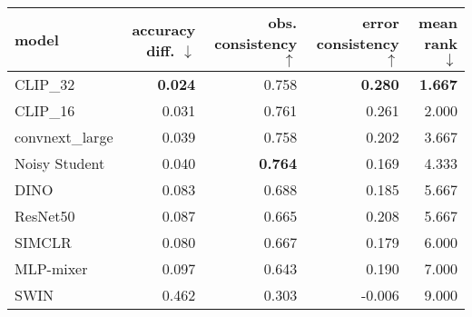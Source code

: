 \begin{tabular}{lrrrr}
\toprule
          model & accuracy diff. $\downarrow$ & obs. consistency $\uparrow$ & error consistency $\uparrow$ & mean rank $\downarrow$ \\
\midrule
       CLIP\_32 &              \textbf{0.024} &                       0.758 &               \textbf{0.280} &         \textbf{1.667} \\
       CLIP\_16 &                       0.031 &                       0.761 &                        0.261 &                  2.000 \\
convnext\_large &                       0.039 &                       0.758 &                        0.202 &                  3.667 \\
  Noisy Student &                       0.040 &              \textbf{0.764} &                        0.169 &                  4.333 \\
           DINO &                       0.083 &                       0.688 &                        0.185 &                  5.667 \\
       ResNet50 &                       0.087 &                       0.665 &                        0.208 &                  5.667 \\
         SIMCLR &                       0.080 &                       0.667 &                        0.179 &                  6.000 \\
      MLP-mixer &                       0.097 &                       0.643 &                        0.190 &                  7.000 \\
           SWIN &                       0.462 &                       0.303 &                       -0.006 &                  9.000 \\
\bottomrule
\end{tabular}

